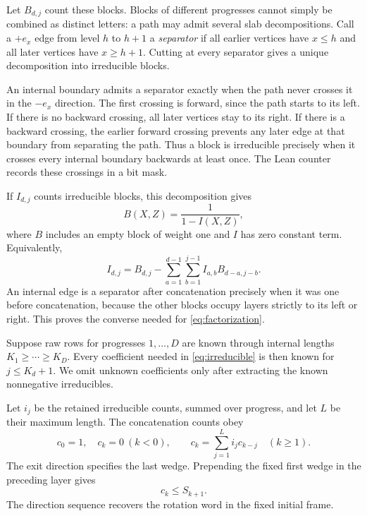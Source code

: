 \documentclass[conference]{IEEEtran}
\begin{document}
Let $B_{d,j}$ count these blocks. Blocks of different progresses
cannot simply be combined as distinct letters: a path may admit
several slab decompositions. Call a $+e_x$ edge from level $h$
to $h+1$ a \emph{separator} if all earlier vertices have $x\leq h$
and all later vertices have $x\geq h+1$.
Cutting at every separator gives a unique decomposition into
irreducible blocks.

An internal boundary admits a separator exactly when the path never
crosses it in the $-e_x$ direction. The first crossing is forward,
since the path starts to its left. If there is no backward crossing,
all later vertices stay to its right. If there is a backward crossing,
the earlier forward crossing prevents any later edge at that boundary
from separating the path.
Thus a block is irreducible precisely when it crosses every internal
boundary backwards at least once. The Lean counter records these
crossings in a bit mask.

If $I_{d,j}$ counts irreducible blocks, this decomposition gives
\begin{equation}\label{eq:factorization}
 B(X,Z)=\frac1{1-I(X,Z)},
\end{equation}
where $B$ includes an empty block of weight one and $I$ has zero
constant term. Equivalently,
\begin{equation}\label{eq:irreducible}
 I_{d,j}=B_{d,j}
 -\sum_{a=1}^{d-1}\sum_{b=1}^{j-1}I_{a,b}B_{d-a,j-b}.
\end{equation}
An internal edge is a separator after concatenation precisely when
it was one before concatenation, because the other blocks occupy
layers strictly to its left or right. This proves the converse
needed for \eqref{eq:factorization}.

Suppose raw rows for progresses $1,\ldots,D$ are known through
internal lengths $K_1\geq\cdots\geq K_D$.
Every coefficient needed in \eqref{eq:irreducible} is then known
for $j\leq K_d+1$. We omit unknown coefficients only after extracting
the known nonnegative irreducibles.

Let $i_j$ be the retained irreducible counts, summed over progress,
and let $L$ be their maximum length. The concatenation counts obey
\begin{equation}\label{eq:renewal}
 c_0=1,\quad c_k=0\ (k<0),\qquad
 c_k=\sum_{j=1}^Li_jc_{k-j}\quad(k\geq1).
\end{equation}
The exit direction specifies the last wedge. Prepending the fixed
first wedge in the preceding layer gives
\begin{equation}\label{eq:lower-pointwise}
 c_k\leq S_{k+1}.
\end{equation}
The direction sequence recovers the rotation word in the fixed
initial frame.
\end{document}
